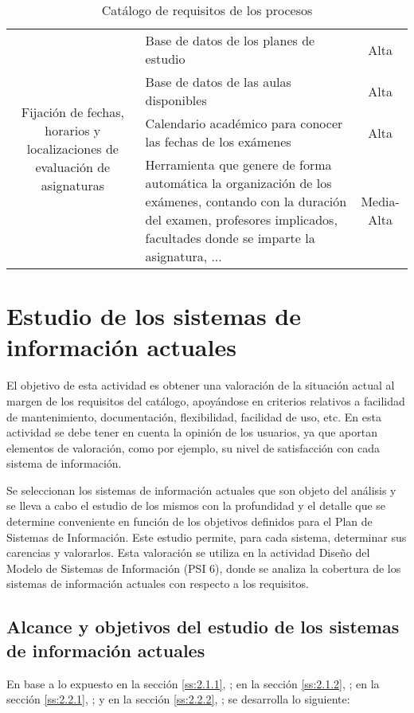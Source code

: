 \documentclass[11pt,a4paper,spanish,twoside]{report}
\begin{document}
\begin{table}[!h]
\begin{tabular}{c|p{5cm}|c}
    \multirow{4}{4cm}{Fijación de fechas, horarios y localizaciones de
      evaluación de asignaturas} 
    & Base de datos de los planes de estudio & Alta \\
    \cline{2-3}
    & Base de datos de las aulas disponibles & Alta \\
    \cline{2-3}
    & Calendario académico para conocer las fechas de los exámenes & Alta \\
    \cline{2-3}
    & Herramienta que genere de forma automática la organización de los
    exámenes, contando con la duración del examen, profesores implicados,
    facultades donde se imparte la asignatura, ... & Media-Alta \\ 
  \end{tabular}
  \caption{Catálogo de requisitos de los procesos} \label{Tab:CatReq}
\end{table}


\chapter{Estudio de los sistemas de información actuales}
El objetivo de esta actividad es obtener una valoración de la situación
actual al margen de los requisitos del catálogo, apoyándose en criterios
relativos a facilidad de mantenimiento, documentación, flexibilidad,
facilidad de uso, etc. En esta actividad se debe tener en cuenta la opinión
de los usuarios, ya que aportan elementos de valoración, como por ejemplo,
su nivel de satisfacción con cada sistema de información. 

Se seleccionan los
sistemas de información actuales que son objeto del análisis y se lleva a
cabo el estudio de los mismos con la profundidad y el detalle que se
determine conveniente en función de los objetivos definidos para el Plan de
Sistemas de Información. Este estudio permite, para cada sistema, determinar
sus carencias y valorarlos. Esta valoración se utiliza en la actividad
Diseño del Modelo de Sistemas de Información (PSI 6), donde se analiza la
cobertura de los sistemas de información actuales con respecto a los
requisitos.

\section{Alcance y objetivos del estudio de los sistemas de 
  información actuales} 
En base a lo expuesto 
en la sección \vref{ss:2.1.1}, \emph{}; 
en la sección \vref{ss:2.1.2}, \emph{}; 
en la sección \vref{ss:2.2.1}, \emph{}; y
en la sección \vref{ss:2.2.2}, \emph{}; 
se desarrolla lo siguiente:
\end{document}
